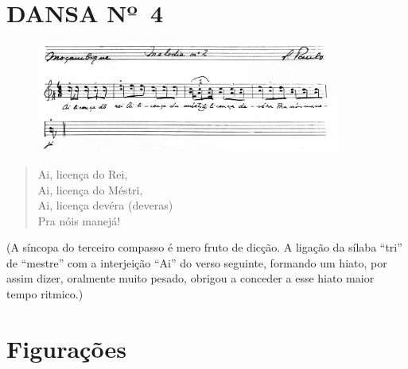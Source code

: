 \pagebreak

\section{DANSA Nº~4}

\begin{figure}[!ht]
\centering
 \includegraphics[width=100mm]{./imgs/img6.jpg}
\end{figure}

\begin{verse}
Ai, licença do Rei,\\
Ai, licença do Méstri,\\
Ai, licença devéra (deveras)\\
Pra nóis manejá!
\end{verse}
(A síncopa do terceiro compasso é mero fruto de dicção. A ligação da
sílaba ``tri'' de ``mestre'' com a interjeição ``Ai'' do verso seguinte,
formando um hiato, por assim dizer, oralmente muito pesado, obrigou a
conceder a esse hiato maior tempo ritmico.)

\section{Figurações}

